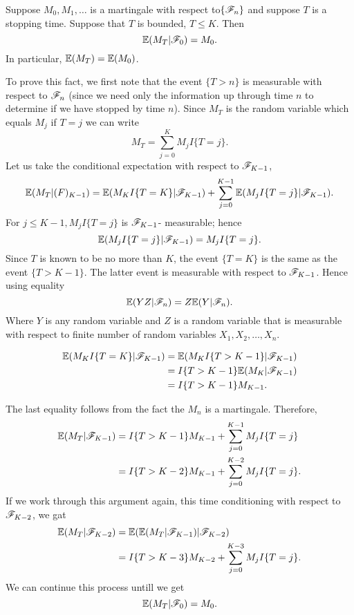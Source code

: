 \documentclass[a4paper,10pt,english]{article}
\begin{document}
\begin{thm} 
Suppose $M_0,M_1,\dots $ is a martingale with respect to$\{\mathscr{F}_n\}$ and suppose $T$ is a stopping time. Suppose that $T$ is bounded, $T\leq K$. Then
\begin{equation*}
\mathbb{E}(M_T|\mathscr{F}_0)=M_0.
\end{equation*}
In particular, $\mathbb{E}(M_T)=\mathbb{E}(M_0)$.
 \end{thm}
To prove this fact, we first note that the event $\{T>n\}$ is measurable with respect to $\mathscr{F}_n$ (since we need only the information up through time $n$ to determine if we have stopped by time $n$). Since $M_T$ is the random variable which equals $M_j$ if $T=j$ we can write
\begin{equation*}
M_T = \sum_{j=0}^K M_j I\{T=j\}.
\end{equation*}
Let us take the conditional expectation with respect to $\mathscr{F}_{K-1}$,
\begin{equation*}
\mathbb{E}(M_T|\mathcal(F)_{K-1})=\mathbb{E}(M_KI\{T=K\}|\mathscr{F}_{K-1})+\sum_{j=0}^{K-1} \mathbb{E}(M_jI\{T=j\}|\mathscr{F}_{K-1}).
\end{equation*}
For $j\leq K-1, M_jI\{T=j\}$ is $\mathscr{F}_{K-1}$- measurable; hence
\begin{equation*}
\mathbb{E}(M_jI\{T=j\}|\mathscr{F}_{K-1})=M_jI\{T=j\}.
\end{equation*}
Since $T$ is known to be no more than $K$, the event $\{T=K\}$ is the same as the event $\{T>K-1\}$. The latter event is measurable with respect to $\mathscr{F}_{K-1}$. Hence using equality
\begin{equation*}
\mathbb{E}(YZ|\mathscr{F}_n)= Z\mathbb{E}(Y|\mathscr{F}_n).
\end{equation*}
Where $Y$ is any random variable and $Z$ is a random variable that is measurable with respect to finite number of random variables $X_1,X_2,\dots,X_n$.

\begin{align*}
\mathbb{E}(M_KI\{T=K\}|\mathscr{F}_{K-1}) &=\mathbb{E}(M_KI\{T>K-1\}|\mathscr{F}_{K-1})\\
&=I\{T>K-1\}\mathbb{E}(M_K|\mathscr{F}_{K-1})\\
&=I\{T>K-1\}M_{K-1}.
\end{align*}

The last equality follows from the fact the $M_n$ is a martingale. Therefore,
\begin{align*}
\mathbb{E}(M_T|\mathscr{F}_{K-1}) &=I\{T>K-1\}M_{K-1}+\sum_{j=0}^{K-1}M_jI\{T=j\}\\
&=I\{T>K-2\}M_{K-1}+\sum_{j=0}^{K-2}M_jI\{T=j\}.
\end{align*}
If we work through this argument again, this time conditioning with respect to $\mathscr{F}_{K-2}$, we gat
\begin{align*}
\mathbb{E}(M_T|\mathscr{F}_{K-2}) &=\mathbb{E}(\mathbb{E}(M_T|\mathscr{F}_{K-1})|\mathscr{F}_{K-2})\\
&=I\{T>K-3\}M_{K-2}+\sum_{j=0}^{K-3}M_jI\{T=j\}.
\end{align*}
We can continue this process untill we get
\begin{equation*}
\mathbb{E}(M_T|\mathscr{F}_0)=M_0.
\end{equation*}
\end{document}
